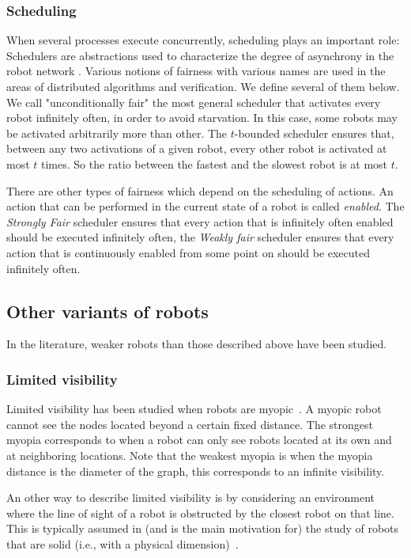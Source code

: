 \subsubsection{Scheduling}
When several processes execute concurrently, scheduling plays an important role: Schedulers are abstractions used to characterize the degree of asynchrony in the robot network \cite{DefagoGMP06,FPS12}. Various notions of fairness with various names are used in the areas of distributed algorithms and verification. We define several of them below.
We call "unconditionally fair" the most general scheduler that activates every robot infinitely often, in order to avoid starvation. In this case, some robots may be activated arbitrarily more than other. The $t$-bounded scheduler ensures that, between any two activations of a given robot, every other robot is activated at most $t$ times. So the ratio between the fastest and the slowest robot is at most $t$. 

There are  other types of fairness which depend on the scheduling of actions. 
An action that can be performed in the current  state of a robot is called \emph{enabled}. The \emph{Strongly Fair} scheduler ensures that every action that is infinitely often enabled should be executed infinitely often, the \emph{Weakly fair} scheduler ensures that every action that is continuously enabled  from some point on should be executed infinitely often.
 

		\subsection{Other variants of robots}
In the literature, weaker robots than those described above have been studied.
\subsubsection{Limited visibility}

Limited visibility has been studied when robots are myopic~\cite{AndoOSY99,FPSW05j, GuilbaultP11,DattaLLP13}. A myopic robot cannot see the nodes located beyond a certain fixed distance. The strongest myopia corresponds to when a robot can only see robots located at its own and at neighboring locations. Note that the weakest myopia is when the myopia distance is the diameter of the graph, this corresponds to an infinite visibility.	

An other way to describe limited visibility is by considering an environment where the line of sight of a robot is obstructed by the closest robot on that line. This is typically assumed in (and is the main motivation for) the study of robots that are solid (i.e., with a physical dimension)~\cite{ChaudhuriM15,CzyzowiczGP09,HPT14}. 


